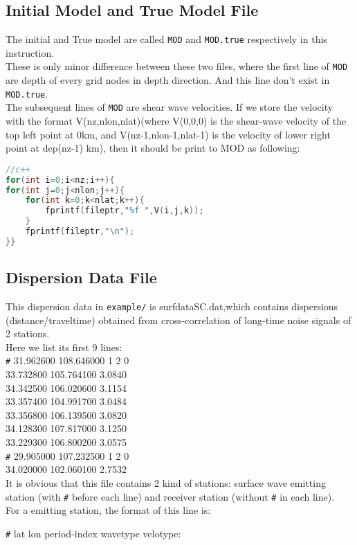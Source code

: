 \documentclass[UTF8]{article}
\begin{document}
    \subsection{Initial Model and True Model File}
    The initial and True model are called \verb!MOD! and \verb!MOD.true! respectively in this instruction.\\
    These is only minor difference between these two files, where the first line of \verb!MOD!
     are depth of every grid nodes in depth direction. And this line don't exist in \verb!MOD.true!.\\

    The subsequent lines of \verb!MOD! are shear wave velocities. If we store the velocity with the 
    format V(nz,nlon,nlat)(where V(0,0,0) is the shear-wave velocity of the 
    top left point at 0km, and V(nz-1,nlon-1,nlat-1) is the velocity of 
    lower right point at dep(nz-1) km), then it should be print to MOD as following:
    \begin{lstlisting}[language=c++]
//c++
for(int i=0;i<nz;i++){
for(int j=0;j<nlon;j++){
    for(int k=0;k<nlat;k++){
        fprintf(fileptr,"%f ",V(i,j,k));
    }
    fprintf(fileptr,"\n");
}} 
  \end{lstlisting}

  \subsection{Dispersion Data File}
  This dispersion data in \verb!example/! is surfdataSC.dat,which contains dispersions (distance/traveltime) 
  obtained from cross-correlation of long-time noise signals of 2 stations. \\
   Here we list its first 9 lines:\\
   \verb!#!  31.962600 108.646000 1 2 0\\
    33.732800 105.764100 3.0840\\
    34.342500 106.020600 3.1154\\
    33.357400 104.991700 3.0484\\
    33.356800 106.139500 3.0820\\
    34.128300 107.817000 3.1250\\
    33.229300 106.800200 3.0575\\
    \verb!#! 29.905000 107.232500 1 2 0\\
    34.020000 102.060100 2.7532\\

    It is obvious that this file contains 2 kind of stations: surface wave emitting 
    station (with \verb!#! before each line) and receiver station (without \verb!#! in each line). \\
    For a emitting station, the format of this line is:\\
    \begin{center}
        \verb!#! lat lon period-index wavetype velotype:
    \end{center}
\end{document}
